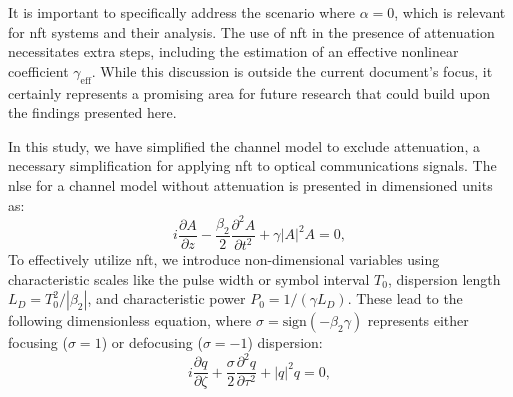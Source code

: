 It is important to specifically address the scenario where \(\alpha = 0\), which is relevant for \Gls{nft} systems and their analysis. The use of \gls{nft} in the presence of attenuation necessitates extra steps, including the estimation of an effective nonlinear coefficient \(\gamma_{\text{eff}}\). While this discussion is outside the current document's focus, it certainly represents a promising area for future research that could build upon the findings presented here.


In this study, we have simplified the channel model to exclude attenuation, a necessary simplification for applying \Gls{nft} to optical communications signals. The \Gls{nlse} for a channel model without attenuation is presented in dimensioned units as:
\begin{equation}
    i\frac{\partial A }{\partial z} - \frac{\beta_2}{2} \frac{\partial^2 A}{\partial t^2} + \gamma |A|^2 A = 0,
\label{eq:nlse}
\end{equation}
To effectively utilize \Gls{nft}, we introduce non-dimensional variables using characteristic scales like the pulse width or symbol interval \( T_0 \), dispersion length \( L_D = T_0^2/|\beta_2| \), and characteristic power \( P_0=1/(\gamma L_D) \). These lead to the following dimensionless equation, where \( \sigma = \mathrm{sign}(-\beta_2 \gamma)\) represents either focusing (\( \sigma = 1 \)) or defocusing (\( \sigma = -1 \)) dispersion:
\begin{equation}
    i \frac{\partial q }{\partial \zeta} + \frac{\sigma}{2} \frac{\partial^2 q}{\partial \tau^2} +  |q|^2 q = 0,
\label{eq:nlse_norm}
\end{equation}






